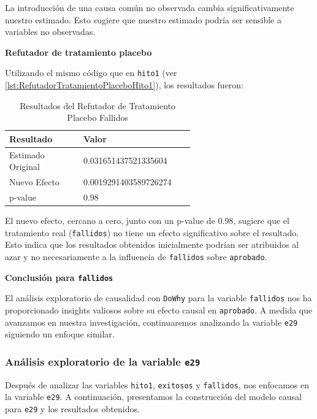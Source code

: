 La introducción de una causa común no observada cambia significativamente nuestro estimado. Esto sugiere que nuestro estimado podría ser sensible a variables no observadas.

\textbf{Refutador de tratamiento placebo}

Utilizando el mismo código que en \texttt{hito1} (ver \ref{lst:RefutadorTratamientoPlaceboHito1}), los resultados fueron:

\begin{table}[H]
    \centering
    \begin{tabular}{lp{0.6\linewidth}}
        \toprule
        \textbf{Resultado} & \textbf{Valor} \\
        \midrule
        Estimado Original & 0.031651437521335604 \\
        Nuevo Efecto & 0.0019291403589726274 \\
        p-value & 0.98 \\
        \bottomrule
    \end{tabular}
    \caption{Resultados del Refutador de Tratamiento Placebo Fallidos}
    \label{tab:refutador_placebo_Fallidos}
\end{table}

El nuevo efecto, cercano a cero, junto con un p-value de 0.98, sugiere que el tratamiento real (\texttt{fallidos}) no tiene un efecto significativo sobre el resultado. Esto indica que los resultados obtenidos inicialmente podrían ser atribuidos al azar y no necesariamente a la influencia de \texttt{fallidos} sobre \texttt{aprobado}.

\textbf{Conclusión para \texttt{fallidos}}

El análisis exploratorio de causalidad con \texttt{DoWhy} para la variable \texttt{fallidos} nos ha proporcionado insights valiosos sobre su efecto causal en \texttt{aprobado}. A medida que avanzamos en nuestra investigación, continuaremos analizando la variable \texttt{e29} siguiendo un enfoque similar.

\subsubsection{Análisis exploratorio de la variable \texttt{e29}}

Después de analizar las variables \texttt{hito1}, \texttt{exitosos} y \texttt{fallidos}, nos enfocamos en la variable \texttt{e29}. A continuación, presentamos la construcción del modelo causal para \texttt{e29} y los resultados obtenidos.

